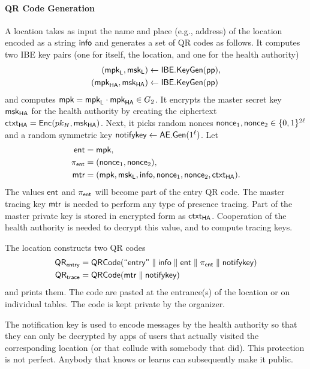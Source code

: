 \paragraph{QR Code Generation} A location takes as input the name and place (e.g., address) of the location encoded as a string $\textsf{info}$ and generates a set of QR codes as follows. It computes two IBE key pairs (one for itself, the location, and one for the health authority)
\begin{align*}
  (\textsf{mpk}_{\textsf{L}}, \textsf{msk}_{\textsf{L}}) &\gets \textsf{IBE.KeyGen}(\textsf{pp}), \\
  (\textsf{mpk}_{\textsf{HA}}, \textsf{msk}_{\textsf{HA}}) &\gets \textsf{IBE.KeyGen}(\textsf{pp})
\end{align*}
and computes $\textsf{mpk} = \textsf{mpk}_{\textsf{L}} \cdot \textsf{mpk}_{\textsf{HA}} \in G_2$. It encrypts the master secret key $\textsf{msk}_{\textsf{HA}}$ for the health authority by creating the ciphertext $\textsf{ctxt}_{\textsf{HA}} = \textsf{Enc}(pk_{H}, \textsf{msk}_{\textsf{HA}})$. Next, it picks random nonces $\textsf{nonce}_1,\allowbreak \textsf{nonce}_2 \in \{0, 1\}^{2\ell}$ and a random symmetric key $\textsf{notifykey} \gets \textsf{AE.Gen}(1^\ell)$. Let
\begin{align*}
  \textsf{ent} &= \textsf{mpk},\\
  \pi_{\textsf{ent}} &= (\textsf{nonce}_1, \textsf{nonce}_2),\\
  \textsf{mtr} &= (\textsf{mpk}, \textsf{msk}_{\textsf{L}}, \textsf{info}, \textsf{nonce}_1,\textsf{nonce}_2, \textsf{ctxt}_{\textsf{HA}}).
\end{align*}
The values $\textsf{ent}$ and $\pi_{\textsf{ent}}$ will become part of the entry QR code. The master tracing key $\textsf{mtr}$ is needed to perform any type of presence tracing. Part of the master private key is stored in encrypted form as $\textsf{ctxt}_{\textsf{HA}}$. Cooperation of the health authority is needed to decrypt this value, and to compute tracing keys.

The location constructs two QR codes
\begin{align*}
  \textsf{QR}_{\textsf{entry}} &= \textsf{QRCode}(\textsf{``entry''} \parallel \textsf{info} \parallel \textsf{ent} \parallel \pi_{\textsf{ent}} \parallel \textsf{notifykey} ) \\
  \textsf{QR}_{\textsf{trace}} &= \textsf{QRCode}(\textsf{mtr} \parallel \textsf{notifykey})
\end{align*}
and prints them. The code \qrentry are pasted at the entrance(s) of the location or on individual tables. The code \qrtrace is kept private by the organizer.

The notification key \notificationkey is used to encode messages by the health authority so that they can only be decrypted by apps of users that actually visited the corresponding location (or that collude with somebody that did). This protection is not perfect. Anybody that knows or learns \notificationkey can subsequently make it public.

